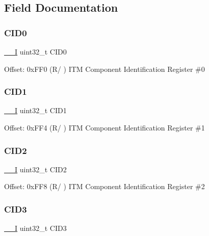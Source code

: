 \subsection{Field Documentation}
\mbox{\label{struct_i_t_m___type_ad613e91338bb994bde578b1a2fcbc1ec}} 
\subsubsection{\texorpdfstring{CID0}{CID0}}
{\footnotesize\ttfamily \mbox{\hyperlink{core__sc300_8h_af63697ed9952cc71e1225efe205f6cd3}{\+\_\+\+\_\+I}} uint32\+\_\+t C\+I\+D0}

Offset\+: 0x\+F\+F0 (R/ ) I\+TM Component Identification Register \#0 \mbox{\label{struct_i_t_m___type_a67f499e16728f744c73dad3784d898d7}} 
\subsubsection{\texorpdfstring{CID1}{CID1}}
{\footnotesize\ttfamily \mbox{\hyperlink{core__sc300_8h_af63697ed9952cc71e1225efe205f6cd3}{\+\_\+\+\_\+I}} uint32\+\_\+t C\+I\+D1}

Offset\+: 0x\+F\+F4 (R/ ) I\+TM Component Identification Register \#1 \mbox{\label{struct_i_t_m___type_ab36bf4236041f727b3e5cf2cfaa2aa04}} 
\subsubsection{\texorpdfstring{CID2}{CID2}}
{\footnotesize\ttfamily \mbox{\hyperlink{core__sc300_8h_af63697ed9952cc71e1225efe205f6cd3}{\+\_\+\+\_\+I}} uint32\+\_\+t C\+I\+D2}

Offset\+: 0x\+F\+F8 (R/ ) I\+TM Component Identification Register \#2 \mbox{\label{struct_i_t_m___type_acb2fedfd1da6ff2a57d25fec513ffe25}} 
\subsubsection{\texorpdfstring{CID3}{CID3}}
{\footnotesize\ttfamily \mbox{\hyperlink{core__sc300_8h_af63697ed9952cc71e1225efe205f6cd3}{\+\_\+\+\_\+I}} uint32\+\_\+t C\+I\+D3}

